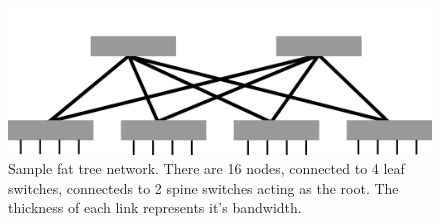 \begin{figure}[h]
	\centering
	\includegraphics[width = 4.5in]{3_Chapters/2_Chapter_Background/Figs/FatTree.png}
	\caption{Sample fat tree network. There are 16 nodes, connected to 4 leaf switches, connecteds to 2 spine switches acting as the root. The thickness of each link represents it's bandwidth.}
	\label{fig:fat-tree-topology}
\end{figure}
